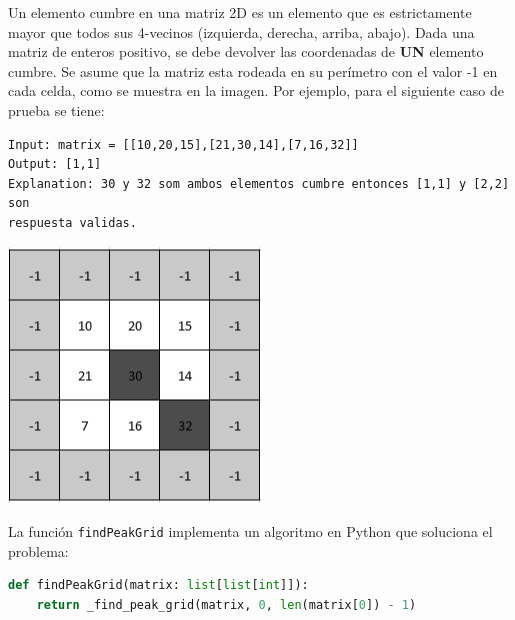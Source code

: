 \documentclass[12pt, a4paper]{exam}
\begin{document}
\begin{questions}
	\pointsdroppedatright
	\question 
    \begin{minipage}{0.7\textwidth}
        Un elemento cumbre en una matriz 2D es un elemento que es  estrictamente mayor que
        todos sus 4-vecinos (izquierda, derecha, arriba, abajo). Dada una matriz de enteros
        positivo, se debe devolver las coordenadas de \textbf{UN} elemento cumbre. Se asume
        que la matriz esta rodeada en su perímetro con el valor -1 en cada celda, como se
        muestra en la imagen. Por ejemplo, para el siguiente caso de prueba se tiene:
        \begin{verbatim}
Input: matrix = [[10,20,15],[21,30,14],[7,16,32]]
Output: [1,1]
Explanation: 30 y 32 som ambos elementos cumbre entonces [1,1] y [2,2] son 
respuesta validas.
        \end{verbatim}
    \end{minipage}%
    \hspace{1em}%
    \begin{minipage}{0.2\textwidth}
        \includegraphics[width=\linewidth]{example-modified.png}
        \label{fig:img1}
    \end{minipage}

    La función \verb|findPeakGrid| implementa un algoritmo en Python que soluciona el
    problema:
\begin{lstlisting}[language=Python]
def findPeakGrid(matrix: list[list[int]]):
	return _find_peak_grid(matrix, 0, len(matrix[0]) - 1)


\end{lstlisting}
\end{questions}
\end{document}
